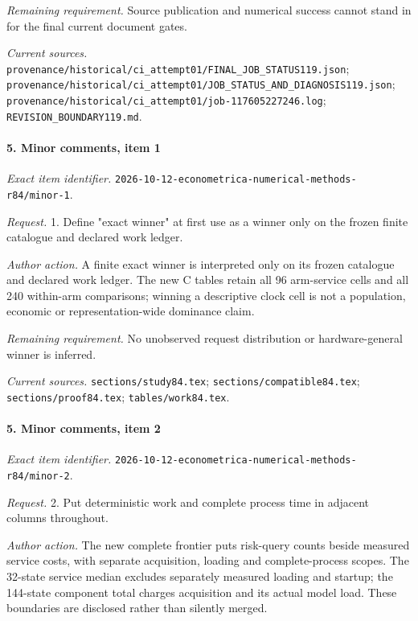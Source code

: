 \par\emph{Remaining requirement.} Source publication and numerical success cannot stand in for the final current document gates.

\par\emph{Current sources.} \nolinkurl{provenance/historical/ci_attempt01/FINAL_JOB_STATUS119.json}; \nolinkurl{provenance/historical/ci_attempt01/JOB_STATUS_AND_DIAGNOSIS119.json}; \nolinkurl{provenance/historical/ci_attempt01/job-117605227246.log}; \nolinkurl{REVISION_BOUNDARY119.md}.

\paragraph{5. Minor comments, item 1}

\emph{Exact item identifier.} \nolinkurl{2026-10-12-econometrica-numerical-methods-r84/minor-1}.

\par\emph{Request.} 1. Define "exact winner" at first use as a winner only on the frozen finite catalogue and declared work ledger.

\par\emph{Author action.} A finite exact winner is interpreted only on its frozen catalogue and declared work ledger. The new C tables retain all 96 arm-service cells and all 240 within-arm comparisons; winning a descriptive clock cell is not a population, economic or representation-wide dominance claim.

\par\emph{Remaining requirement.} No unobserved request distribution or hardware-general winner is inferred.

\par\emph{Current sources.} \nolinkurl{sections/study84.tex}; \nolinkurl{sections/compatible84.tex}; \nolinkurl{sections/proof84.tex}; \nolinkurl{tables/work84.tex}.

\paragraph{5. Minor comments, item 2}

\emph{Exact item identifier.} \nolinkurl{2026-10-12-econometrica-numerical-methods-r84/minor-2}.

\par\emph{Request.} 2. Put deterministic work and complete process time in adjacent columns throughout.

\par\emph{Author action.} The new complete frontier puts risk-query counts beside measured service costs, with separate acquisition, loading and complete-process scopes. The 32-state service median excludes separately measured loading and startup; the 144-state component total charges acquisition and its actual model load. These boundaries are disclosed rather than silently merged.

